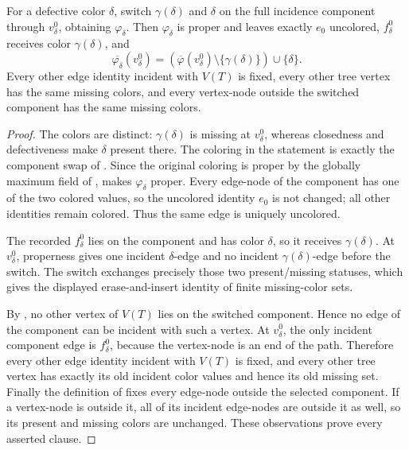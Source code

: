 \begin{lemma}
For a defective color $\delta$, switch
$\gamma(\delta)$ and $\delta$ on the full incidence component through
$v^0_\delta$, obtaining $\varphi_\delta$.  Then
$\varphi_\delta$ is proper and leaves exactly $e_0$ uncolored,
$f^0_\delta$ receives color $\gamma(\delta)$, and
\[
 \overline{\varphi_\delta}(v^0_\delta)=
 (\overline\varphi(v^0_\delta)\setminus\{\gamma(\delta)\})
 \cup\{\delta\}.
\]
Every other edge identity incident with $V(T)$ is fixed, every other tree
vertex has the same missing colors, and every vertex-node outside the
switched component has the same missing colors.
\end{lemma}
\begin{proof}
The colors are distinct: $\gamma(\delta)$ is missing at
$v^0_\delta$, whereas closedness and defectiveness make $\delta$ present
there.  The coloring in the statement is exactly the component swap of
.  Since the original coloring is proper by
the globally maximum field of ,
 makes $\varphi_\delta$ proper.
Every edge-node of the component has one of the two colored values, so the
uncolored identity $e_0$ is not changed; all other identities remain
colored.  Thus the same edge is uniquely uncolored.

The recorded $f^0_\delta$ lies on the component and has color $\delta$,
so it receives $\gamma(\delta)$.  At $v^0_\delta$, properness gives one
incident $\delta$-edge and no incident $\gamma(\delta)$-edge before the
switch.  The switch exchanges precisely those two present/missing statuses,
which gives the displayed erase-and-insert identity of finite missing-color
sets.

By , no other vertex of $V(T)$ lies
on the switched component.  Hence no edge of the component can be incident
with such a vertex.  At $v^0_\delta$, the only incident component edge is
$f^0_\delta$, because the vertex-node is an end of the path.  Therefore
every other edge identity incident with $V(T)$ is fixed, and every other
tree vertex has exactly its old incident color values and hence its old
missing set.  Finally the definition of
 fixes every edge-node outside the selected
component.  If a vertex-node is outside it, all of its incident edge-nodes
are outside it as well, so its present and missing colors are unchanged.
These observations prove every asserted clause.
\end{proof}
